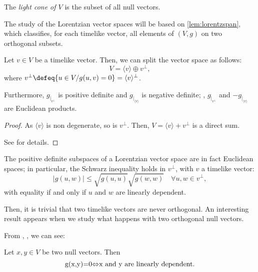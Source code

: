\begin{definition}
	The \emph{light cone of $V$} is the subset of all null vectors.
\end{definition}

The study of the Lorentzian vector spaces will be based on \autoref{lem:lorentzspan}, which classifies, for each timelike vector, all elements of $(V,g)$ on two orthogonal subsets.

\begin{lemma}
	\label{lem:lorentzspan}
	Let $v \in V$ be a timelike vector. Then, we can split the vector space as follows:
	\[
		V = \langle v \rangle \oplus v^\perp,
	\]
	where $v^\perp \defeq \{u \in V / g(u,v) = 0\} = \langle v \rangle^\perp$.
	
	Furthermore, $g_{\mid_{v^\perp}}$ is positive definite and $g_{\mid_{\langle v \rangle}}$ is negative definite; \ie, $g_{\mid_{v^\perp}}$ and $-g_{\mid_{\langle v \rangle}}$ are Euclidean products.
\end{lemma}

\begin{proof}
	As $\langle v \rangle$ is non degenerate, so is $v^\perp$. Then, $V = \langle v \rangle + v^\perp$ is a direct sum.
	
	See \cite[Lemma 5.26]{oneill83} for details.
\end{proof}

\begin{remark}\label{classic_Schwarz}
	The positive definite subspaces of a Lorentzian vector space are in fact Euclidean spaces; in particular, the Schwarz inequality holds in $v^\perp$, with $v$ a timelike vector:
    \begin{equation}
	    \label{eq:schwarz}
        \lvert g(u,w) \rvert \leq \sqrt{g(u,u)} \sqrt{g(w,w)} \quad \forall u,w \in v^\perp,
    \end{equation}
    with equality if and only if $u$ and $w$ are linearly dependent.
\end{remark}

Then, it is trivial that two timelike vectors are never orthogonal. An interesting result appears when we study what happens with two orthogonal null vectors.

From \cite[Cor. 1.1.5]{sachs77}, \cite[p. 155]{oneill83}, we can see:

\begin{proposition} Let $x,y \in V$ be two null vectors. Then
	\[
		$g(x,y)=0$ \Leftrightarrow $x$ \textrm{ and } $y$ \textrm{ are linearly dependent}.
	\]
\end{proposition}


